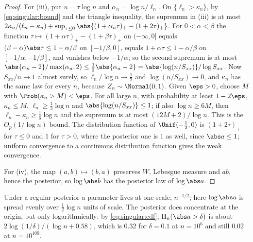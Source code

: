 \begin{refsection}
\begin{proof}
For (iii), put $u=\tau\log n$ and $\alpha_n=\log n/\ell_n$. On $\{\ell_n>\kappa_n\}$, by \eqref{eq:singular:bound} and the triangle inequality, the supremum in (iii) is at most $2\kappa_n/(\ell_n-\kappa_n)+\sup_{\tau\le0}\abs{(1+\alpha_n\tau)_+-(1+2\tau)_+}$. For $0<\alpha<\beta$ the function $\tau\mapsto(1+\alpha\tau)_+-(1+\beta\tau)_+$ on $(-\infty,0]$ equals $(\beta-\alpha)\abs\tau\le1-\alpha/\beta$ on $[-1/\beta,0]$, equals $1+\alpha\tau\le1-\alpha/\beta$ on $[-1/\alpha,-1/\beta]$, and vanishes below $-1/\alpha$; so the second supremum is at most $\abs{\alpha_n-2}/\max(\alpha_n,2)\le\frac12\abs{\alpha_n-2}=\abs{\log(n/S_{xx})}/\log S_{xx}$. Now $S_{xx}/n\to1$ almost surely, so $\ell_n/\log n\to\frac12$ and $\log(n/S_{xx})\to0$, and $\kappa_n$ has the same law for every $n$, because $Z_n\sim\Normal(0,1)$. Given $\eps>0$, choose $M$ with $\Prob(\kappa_n>M)<\eps$. For all large $n$, with probability at least $1-2\eps$, $\kappa_n\le M$, $\ell_n\ge\frac13\log n$ and $\abs{\log(n/S_{xx})}\le1$; if also $\log n\ge6M$, then $\ell_n-\kappa_n\ge\frac16\log n$ and the supremum is at most $(12M+2)/\log n$. This is the $O_p(1/\log n)$ bound. The distribution function of $\Unif(-\frac12,0)$ is $(1+2\tau)_+$ for $\tau\le0$ and $1$ for $\tau>0$, where the posterior one is $1$ as well, since $\abs a\le1$; uniform convergence to a continuous distribution function gives the weak convergence.

For (iv), the map $(a,b)\mapsto(b,a)$ preserves $W$, Lebesgue measure and $ab$, hence the posterior, so $\log\abs b$ has the posterior law of $\log\abs a$.
\end{proof}

Under a regular posterior a parameter lives at one scale, $n^{-1/2}$; here $\log\abs a$ is spread evenly over $\frac12\log n$ units of scale. The posterior does concentrate at the origin, but only logarithmically: by \eqref{eq:singular:cdf}, $\Pi_n(\abs a>\delta)$ is about $2\log(1/\delta)/(\log n+0.58)$, which is $0.32$ for $\delta=0.1$ at $n=10^6$ and still $0.02$ at $n=10^{100}$.


\end{refsection}

